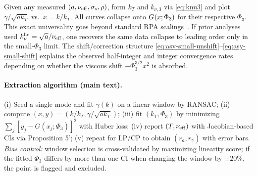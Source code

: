 \documentclass[aps,pre,twocolumn,showpacs,superscriptaddress]{revtex4-2}
\theoremstyle{definition}
\begin{document}
Given any measured $(a,\nu_{\rm eff},\sigma_s,\rho)$, form $k_T$ and $k_{\nu,3}$ via \eqref{eq:knu3} and plot $\gamma/\sqrt{a k_T}$ vs.\ $x=k/k_T$. All curves collapse onto $G_{\*}(x;\Phi_3)$ for their respective $\Phi_3$. This exact universality goes beyond standard RPA scalings~\cite{Robinson2009PPCF,Klimo2008PRSTAB,Macchi2009PRL_RPA}. If prior analyses used $k_\nu^{\rm he}=\sqrt{a}/\nu_{\rm eff}$, one recovers the same data collapse to leading order only in the small‑$\Phi_3$ limit. The shift/correction structure \eqref{eq:asy-small-unshift}–\eqref{eq:asy-small-shift} explains the observed half‑integer and integer convergence rates depending on whether the viscous shift $-\Phi_3^{3/2}x^2$ is absorbed.

\paragraph*{Extraction algorithm (main text).}
(i) Seed a single mode and fit $\gamma(k)$ on a linear window by RANSAC; 
(ii) compute $(x,y)=(k/k_T,\gamma/\sqrt{ak_T})$; 
(iii) fit $(k_T,\Phi_3)$ by minimizing $\sum_j [y_j-G(x_j;\Phi_3)]^2$ with Huber loss;
(iv) report $(T,\nu_{\rm eff})$ with Jacobian-based CIs via Proposition 5'; 
(v) repeat for LP/CP to obtain $(r_a,r_\gamma)$ with error bars.
\emph{Bias control:} window selection is cross-validated by maximizing linearity score; if the fitted $\Phi_3$ differs by more than one CI when changing the window by $\pm20\%$, the point is flagged and excluded.
\end{document}

